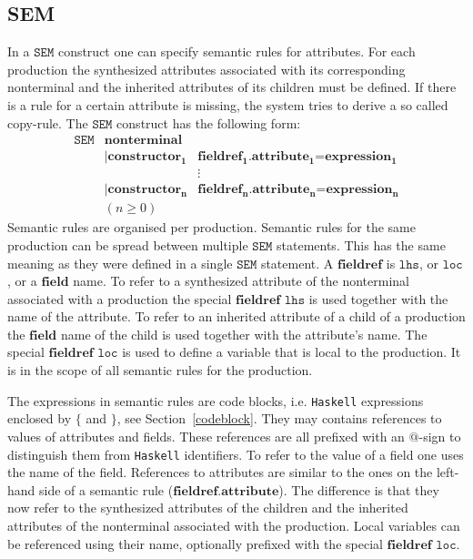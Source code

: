 \documentclass{article}
\newcommand{\keyword}[1]{\ensuremath{\mathtt{#1}}}
\newcommand{\Haskell}{\texttt{Haskell}}
\newcommand{\term}[1]{\ensuremath{\texttt{#1}}}
\newcommand{\nt}[1]{\ensuremath{\mathbf{#1}}}
\newcommand{\SubSec}[1]{\subsection{#1}}
\begin{document}
\SubSec{SEM}

In a \keyword{SEM} construct one can specify semantic rules for attributes. 
For each production the synthesized attributes associated with its corresponding nonterminal and the inherited attributes of its children must be defined. If there is a rule for a certain attribute is missing, the system tries to derive a so called copy-rule. 
The \keyword{SEM} construct has the following form:
\begin{displaymath}
\begin{array}{lll}
\term{SEM}  & \nt{nonterminal}\\
            & \term{|} \nt{constructor_1} & \nt{fieldref_{1}}\term{.}\nt{attribute_{1}} \term{=} \nt{expression_{1}} \\
            &                             & \vdots \\
            & \term{|} \nt{constructor_n} & \nt{fieldref_{n}}\term{.}\nt{attribute_{n}} \term{=} \nt{expression_{n}} \\
            & (n \geq 0 ) &
\end{array}
\end{displaymath}
Semantic rules are organised per production. Semantic rules for the same production can be spread between multiple \keyword{SEM} statements. This has the same meaning as they were defined in a single \keyword{SEM} statement. 
A \nt{fieldref} is \term{lhs}, or \term{loc}, or a \nt{field} name. To refer to a synthesized attribute of the nonterminal associated with a production the special \nt{fieldref} \term{lhs} is used together with the name of the attribute. To refer to an inherited attribute of a child of a production the \nt{field} name of the child is used together with the attribute's name. The special \nt{fieldref} \term{loc} is used to define a variable that is local to the production. It is in the scope of all semantic rules for the production. 

The expressions in semantic rules are code blocks, i.e. {\Haskell} expressions enclosed by \term{\{} and \term{\}}, see Section~\ref{codeblock}. They may contains references to values of attributes and fields. These references are all prefixed with an \term{@}-sign to distinguish them from {\Haskell} identifiers. To refer to the value of a field one uses the name of the field. References to attributes are similar to the ones on the left-hand side of a semantic rule (\nt{fieldref}\term{.}\nt{attribute}). The difference is that they now refer to the synthesized attributes of the children and the inherited attributes of the nonterminal associated with the production. Local variables can be referenced using their name, optionally prefixed with the special \nt{fieldref} \term{loc}.  
\end{document}
